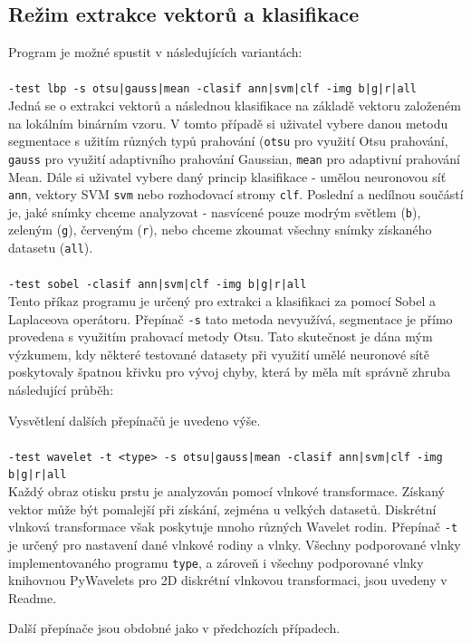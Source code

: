 \subsection{Režim extrakce vektorů a klasifikace}
Program je možné spustit v následujících variantách:\\\\
\verb=-test lbp -s otsu|gauss|mean -clasif ann|svm|clf -img b|g|r|all=\\
Jedná se o extrakci vektorů a následnou klasifikace na základě vektoru založeném na lokálním binárním vzoru. V tomto případě si uživatel vybere danou metodu segmentace s užitím různých typů prahování (\verb=otsu= pro využití Otsu prahování, \verb=gauss= pro využití adaptivního prahování Gaussian, \verb=mean= pro adaptivní prahování Mean. Dále si uživatel vybere daný princip klasifikace - umělou neuronovou síť \verb=ann=, vektory SVM \verb=svm= nebo rozhodovací stromy \verb=clf=. Poslední a nedílnou součástí je, jaké snímky chceme analyzovat - nasvícené pouze modrým světlem (\verb=b=), zeleným (\verb=g=), červeným (\verb=r=), nebo chceme zkoumat všechny snímky získaného datasetu (\verb=all=).\\\\
\verb=-test sobel -clasif ann|svm|clf -img b|g|r|all=\\
Tento příkaz programu je určený pro extrakci a klasifikaci za pomocí Sobel a Laplaceova operátoru. Přepínač \verb=-s= tato metoda nevyužívá, segmentace je přímo provedena s využitím prahovací metody Otsu. Tato skutečnost je dána mým výzkumem, kdy některé testované datasety při využití umělé neuronové sítě poskytovaly špatnou křivku pro vývoj chyby, která by měla mít správně zhruba následující průběh:

Vysvětlení dalších přepínačů je uvedeno výše.\\\\
\verb=-test wavelet -t <type> -s otsu|gauss|mean -clasif ann|svm|clf -img b|g|r|all=\\
Každý obraz otisku prstu je analyzován pomocí vlnkové transformace. Získaný vektor může být pomalejší při získání, zejména u velkých datasetů. Diskrétní vlnková transformace však poskytuje mnoho různých Wavelet rodin. Přepínač \verb=-t= je určený pro nastavení dané vlnkové rodiny a vlnky. Všechny podporované vlnky implementovaného programu \verb=type=, a zároveň i všechny podporované vlnky knihovnou PyWavelets pro 2D diskrétní vlnkovou transformaci, jsou uvedeny v Readme. 

Další přepínače jsou obdobné jako v předchozích případech.

